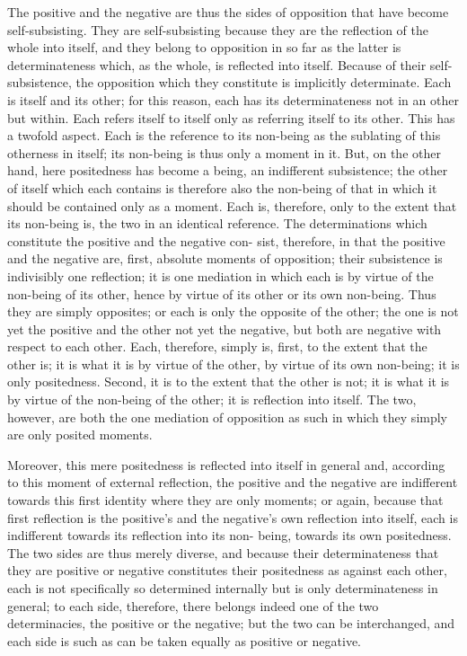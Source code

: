 The positive and the negative are thus the sides of opposition that
have become self-subsisting. They are self-subsisting because they are the
reflection of the whole into itself, and they belong to opposition in so far
as the latter is determinateness which, as the whole, is reflected into itself.
Because of their self-subsistence, the opposition which they constitute is
implicitly determinate. Each is itself and its other; for this reason, each
has its determinateness not in an other but within.  Each refers itself to
itself only as referring itself to its other. This has a twofold aspect. Each
is the reference to its non-being as the sublating of this otherness in itself;
its non-being is thus only a moment in it. But, on the other hand, here
positedness has become a being, an indifferent subsistence; the other of
itself which each contains is therefore also the non-being of that in which
it should be contained only as a moment. Each is, therefore, only to the
extent that its non-being is, the two in an identical reference.
The determinations which constitute the positive and the negative con-
sist, therefore, in that the positive and the negative are, first, absolute
moments of opposition; their subsistence is indivisibly one reflection; it is
one mediation in which each is by virtue of the non-being of its other,
hence by virtue of its other or its own non-being.  Thus they are simply
opposites; or each is only the opposite of the other; the one is not yet the
positive and the other not yet the negative, but both are negative with
respect to each other. Each, therefore, simply is, first, to the extent that the
other is; it is what it is by virtue of the other, by virtue of its own non-being;
it is only positedness. Second, it is to the extent that the other is not; it is what
it is by virtue of the non-being of the other; it is reflection into itself.  The
two, however, are both the one mediation of opposition as such in which
they simply are only posited moments.

Moreover, this mere positedness is reflected into itself in general and,
according to this moment of external reflection, the positive and the negative
are indifferent towards this first identity where they are only moments; or
again, because that first reflection is the positive’s and the negative’s own
reflection into itself, each is indifferent towards its reflection into its non-
being, towards its own positedness. The two sides are thus merely diverse,
and because their determinateness  that they are positive or negative
constitutes their positedness as against each other, each is not specifically so
determined internally but is only determinateness in general; to each side,
therefore, there belongs indeed one of the two determinacies, the positive
or the negative; but the two can be interchanged, and each side is such as
can be taken equally as positive or negative.

